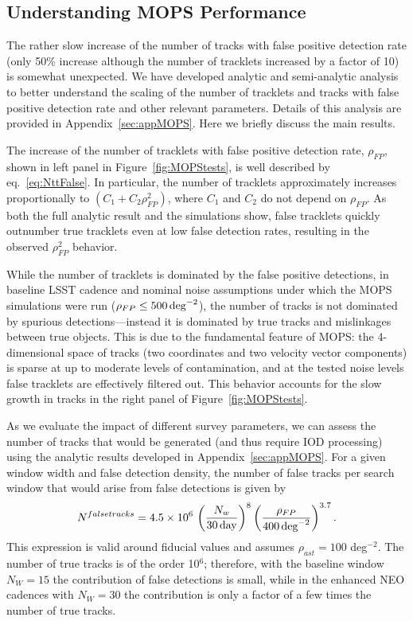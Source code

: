\subsection{Understanding MOPS Performance}

The rather slow increase of the number of tracks with false positive detection rate (only 50\% increase
although the number of tracklets increased by a factor of 10) is somewhat unexpected. We have
developed analytic and semi-analytic analysis to better understand the scaling of the number of
tracklets and tracks with false positive detection rate and other relevant parameters. Details of this
analysis are provided in Appendix~\ref{sec:appMOPS}. Here we briefly discuss the main results.

The increase of the number of tracklets with false positive detection rate,
$\rho_{FP}$, shown in left panel in Figure~\ref{fig:MOPStests}, is well
described by eq.~\ref{eq:NttFalse}. In particular, the number of tracklets
approximately increases proportionally to $(C_1 + C_2\rho_{FP}^2)$, where $C_1$
and $C_2$ do not depend on $\rho_{FP}$. As both the full analytic result and the
simulations show, false tracklets quickly outnumber true tracklets even at low
false detection rates, resulting in the observed $\rho_{FP}^2$ behavior.

While the number of tracklets is dominated by the false positive detections, in
baseline LSST cadence and nominal noise assumptions under which the MOPS
simulations were run ($\rho_{FP} \leq 500\,\rm{deg}^{-2}$), the number of
tracks is not dominated by spurious detections---instead it is dominated by true
tracks and mislinkages between true objects. This is due to the fundamental
feature of MOPS: the 4-dimensional space of tracks (two coordinates and two
velocity vector components) is sparse at up to moderate levels of contamination,
and at the tested noise levels false tracklets are effectively filtered out. This
behavior accounts for the slow growth in tracks in the right panel of
Figure~\ref{fig:MOPStests}.

As we evaluate the impact of different survey parameters, we can assess the
number of tracks that would be generated (and thus require IOD processing) using
the analytic results developed in Appendix~\ref{sec:appMOPS}. For a given window
width and false detection density, the number of false tracks per search window
that would arise from false detections is given by
\begin{equation}
\label{eq:falsetracks2}
   N^{falsetracks} = 4.5 \times 10^6 \, \left( {N_w \over 30 \, {\rm day} } \right)^{8} \left( {\rho_{FP} \over 400 \, {\rm deg}^{-2} }\right)^{3.7}.
\end{equation}
This expression is valid around fiducial values and assumes $\rho_{ast}=100$ deg$^{-2}$.
The number of true tracks is of the order 10$^6$; therefore, with the baseline
window $N_W=15$ the contribution of false detections is small, while in the
enhanced NEO cadences with $N_W=30$ the contribution is only a factor of a few
times the number of true tracks.

